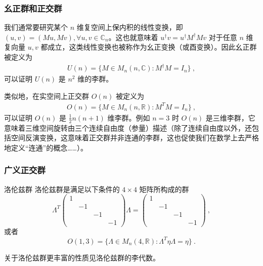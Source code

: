 \subsubsection{幺正群和正交群}
我们通常要研究某个 $n$ 维复空间上保内积的线性变换，即 $(u,v)=(Mu,Mv),\forall u,v\in \mathbb{C}_n$。这也就意味着 $u^\dagger v=u^\dagger M^\dagger M v$ 对于任意 $n$ 维复向量 $u,v$ 都成立，这类线性变换也被称作为幺正变换（或酉变换）。因此幺正群被定义为
\begin{equation}
\begin{aligned}
U(n)=\{ M\in M_n(n,\mathbb C): M^\dagger M=I_n \}~,
\end{aligned}
\end{equation}
可以证明 $U(n)$ 是 $n^2$ 维的李群。

类似地，在实空间上正交群 $O(n)$ 被定义为 
\begin{equation}
\begin{aligned}
O(n)=\{ M\in M_n(n,\mathbb R): M^T M=I_n \}~,
\end{aligned}
\end{equation}
可以证明 $O(n)$ 是 $\frac{1}{2}n(n+1)$ 维李群。例如 $n=3$ 时 $O(n)$ 是三维李群，它意味着三维空间旋转由三个连续自由度（参量）描述（除了连续自由度以外，还包括空间反演变换，这意味着正交群并非连通的李群，这也促使我们在数学上去严格地定义“连通”的概念……）。
\subsubsection{广义正交群}
\begin{definition}{洛伦兹群}
洛伦兹群是满足以下条件的 $4\times 4$ 矩阵所构成的群
\begin{equation}
\Lambda^T \begin{pmatrix}
1&&&\\
&-1&&\\
&&-1&\\
&&&-1
\end{pmatrix}
\Lambda =\begin{pmatrix}
1&&&\\
&-1&&\\
&&-1&\\
&&&-1
\end{pmatrix}~,
\end{equation}
或者
\begin{equation}
O(1,3)=\{\Lambda\in M_n(4,\mathbb R):\Lambda^T\eta\Lambda=\eta\}~.
\end{equation}

\end{definition}
关于洛伦兹群更丰富的性质见洛伦兹群的李代数。

